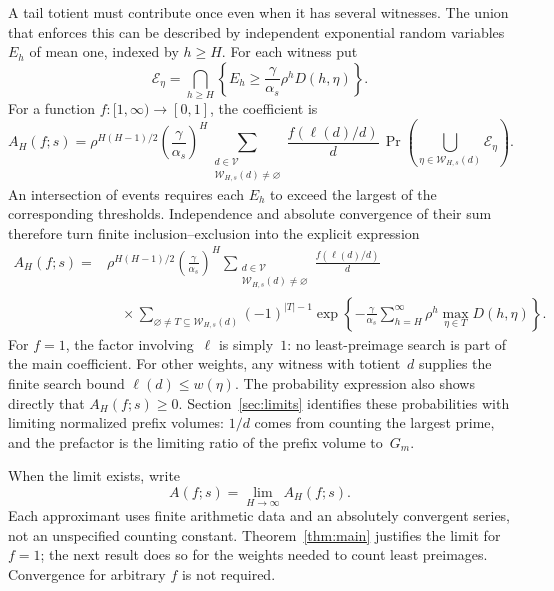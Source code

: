 A tail totient must contribute once even when it has several witnesses.
The union that enforces this can be described by independent exponential
random variables $E_h$ of mean one, indexed by $h\ge H$. For each witness
put
\begin{equation}\label{eq:tail-events}
 \mathcal E_\eta=
 \bigcap_{h\ge H}
 \left\{E_h\ge\frac\gamma{\alpha_s}\rho^hD(h,\eta)\right\}.
\end{equation}
For a function $f:[1,\infty)\to[0,1]$, the coefficient is
\[
 A_H(f;s)=\rho^{H(H-1)/2}
       \left(\frac\gamma{\alpha_s}\right)^H
       \sum_{\substack{d\in\mathcal V\\\mathcal W_{H,s}(d)\ne\varnothing}}
       \frac{f(\ell(d)/d)}d\,
       \Pr\left(\bigcup_{\eta\in\mathcal W_{H,s}(d)}
                    \mathcal E_\eta\right).
\]
An intersection of events requires each $E_h$ to exceed the largest
of the corresponding thresholds. Independence and absolute convergence
of their sum therefore turn finite inclusion--exclusion into the
explicit expression
\begin{equation}\label{eq:AH}
\begin{split}
 A_H(f;s)={}&\rho^{H(H-1)/2}
       \left(\frac{\gamma}{\alpha_s}\right)^H
       \sum_{\substack{d\in\mathcal V\\\mathcal W_{H,s}(d)\ne\varnothing}}
       \frac{f(\ell(d)/d)}d\\[-2pt]
 &\quad\times
 \sum_{\varnothing\ne T\subseteq\mathcal W_{H,s}(d)}
       (-1)^{|T|-1}
 \exp\left\{-\frac{\gamma}{\alpha_s}
       \sum_{h=H}^{\infty}\rho^h
                    \max_{\eta\in T}D(h,\eta)\right\}.
\end{split}
\end{equation}
For $f=1$, the factor involving~$\ell$ is simply~$1$: no least-preimage
search is part of the main coefficient. For other weights, any witness
with totient~$d$ supplies the finite search bound $\ell(d)\le w(\eta)$.
The probability expression also shows directly that $A_H(f;s)\ge0$.
Section~\ref{sec:limits} identifies these probabilities with limiting
normalized prefix volumes: $1/d$ comes from counting the largest prime, and the
prefactor is the limiting ratio of the prefix volume to~$G_m$.

When the limit exists, write
\[
 A(f;s)=\lim_{H\to\infty}A_H(f;s).
\]
Each approximant uses finite arithmetic data and an absolutely convergent
series, not an unspecified counting constant. Theorem~\ref{thm:main}
justifies the limit for $f=1$; the next result does so for the weights
needed to count least preimages. Convergence for arbitrary $f$ is not
required.

